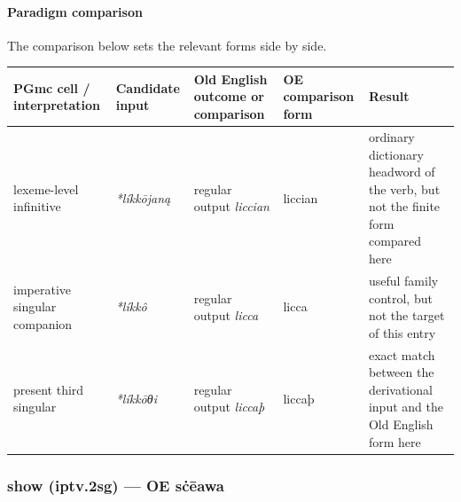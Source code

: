 \documentclass[
  british,
  a4paper,
]{article}
\newcounter{none} %
\begin{document}
\paragraph{Paradigm comparison}\label{paradigm-comparison-25}

The comparison below sets the relevant forms side by side.

{\def\LTcaptype{none} %
\begin{longtable}[]{@{}
  >{\raggedright\arraybackslash}p{}
  >{\raggedright\arraybackslash}p{}
  >{\raggedright\arraybackslash}p{}
  >{\raggedright\arraybackslash}p{}
  >{\raggedright\arraybackslash}p{}@{}}
\toprule\noalign{}
\begin{minipage}[b]{\linewidth}\raggedright
PGmc cell / interpretation
\end{minipage} & \begin{minipage}[b]{\linewidth}\raggedright
Candidate input
\end{minipage} & \begin{minipage}[b]{\linewidth}\raggedright
Old English outcome or comparison
\end{minipage} & \begin{minipage}[b]{\linewidth}\raggedright
OE comparison form
\end{minipage} & \begin{minipage}[b]{\linewidth}\raggedright
Result
\end{minipage} \\
\midrule\noalign{}
\endhead
\bottomrule\noalign{}
\endlastfoot
lexeme-level infinitive & \emph{*líkkōjaną} & regular output
\emph{liccian} & liccian & ordinary dictionary headword of the verb, but
not the finite form compared here \\
imperative singular companion & \emph{*líkkô} & regular output
\emph{licca} & licca & useful family control, but not the target of this
entry \\
present third singular & \emph{*líkkōθi} & regular output \emph{liccaþ}
& liccaþ & exact match between the derivational input and the Old
English form here \\
\end{longtable}
}

\subsubsection{show (iptv.2sg) --- OE
sċēawa}\label{show-iptv.2sg-oe-sux10bux113awa}
\end{document}
